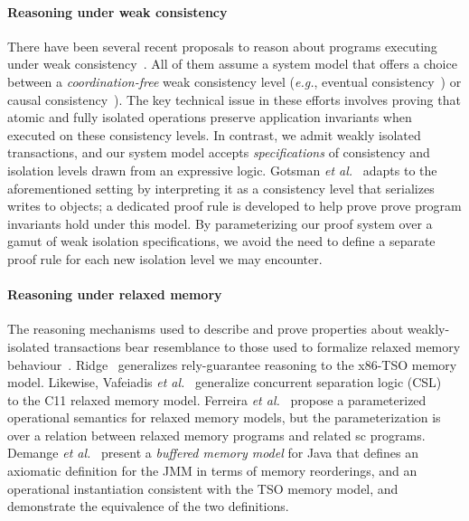 \paragraph{Reasoning under weak consistency} There have been several
recent proposals to reason about programs executing under weak
consistency~\cite{bailisvldb, alvarocalm, gotsmanpopl16,redblueatc,
redblueosdi, ecinec}. All of them assume a system model that offers a
choice between a \emph{coordination-free} weak consistency level
(\emph{e.g.}, eventual consistency~\cite{redblueosdi, redblueatc,
ecinec, alvarocalm, bailisvldb}) or causal
consistency~\cite{lbc16,gotsmanpopl16}). The key technical issue in
these efforts involves proving that atomic and fully isolated
operations preserve application invariants when executed on these
consistency levels.  In contrast, we admit weakly isolated
transactions, and our system model accepts \emph{specifications} of
consistency and isolation levels drawn from an expressive logic.
Gotsman \emph{et al.}~\cite{gotsmanpopl16} adapts  to the aforementioned setting by interpreting it
as a consistency level that serializes writes to objects; a dedicated
proof rule is developed to help prove prove program invariants hold
under this model. By parameterizing our proof system over a gamut of
weak isolation specifications, we avoid the need to define a separate
proof rule for each new isolation level we may encounter.

\paragraph{Reasoning under relaxed memory} The reasoning mechanisms
used to describe and prove properties about weakly-isolated
transactions bear resemblance to those used to formalize relaxed
memory behaviour~\cite{battycpp}.  Ridge~\cite{rgtso} generalizes
rely-guarantee reasoning to the x86-TSO memory model.  Likewise,
Vafeiadis \emph{et al.}~\cite{rsl13} generalize concurrent separation
logic (CSL)~\cite{csl} to the C11 relaxed memory model.  Ferreira
\emph{et al.}~\cite{ferreira10} propose a parameterized operational
semantics for relaxed memory models, but the parameterization is over
a relation between relaxed memory programs and related {\sc sc}
programs. Demange \emph{et al.}~\cite{DLZ+13} present a \emph{buffered
  memory model} for Java that defines an axiomatic definition for the
JMM in terms of memory reorderings, and an operational instantiation
consistent with the TSO memory model, and demonstrate the equivalence
of the two definitions.  

